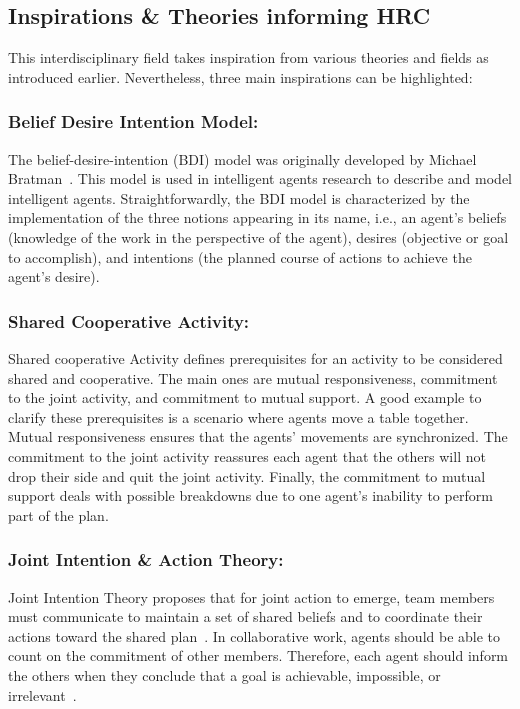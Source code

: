 \subsection{Inspirations \& Theories informing HRC}

This interdisciplinary field takes inspiration from various theories and fields as introduced earlier. Nevertheless, three main inspirations can be highlighted:

\subsubsection*{Belief Desire Intention Model:} The belief-desire-intention (BDI) model was originally developed by Michael Bratman~\cite{Bratman1987_BRAIPA}. This model is used in intelligent agents research to describe and model intelligent agents. Straightforwardly, the BDI model is characterized by the implementation of the three notions appearing in its name, i.e., an agent's beliefs (knowledge of the work in the perspective of the agent), desires (objective or goal to accomplish), and intentions (the planned course of actions to achieve the agent's desire). 

\subsubsection*{Shared Cooperative Activity:} Shared cooperative Activity defines prerequisites for an activity to be considered shared and cooperative. The main ones are mutual responsiveness, commitment to the joint activity, and commitment to mutual support. A good example to clarify these prerequisites is a scenario where agents move a table together. Mutual responsiveness ensures that the agents' movements are synchronized. The commitment to the joint activity reassures each agent that the others will not drop their side and quit the joint activity. Finally, the commitment to mutual support deals with possible breakdowns due to one agent's inability to perform part of the plan.  

\subsubsection*{Joint Intention \& Action Theory:} 
Joint Intention Theory proposes that for joint action to emerge, team members must communicate to maintain a set of shared beliefs and to coordinate their actions toward the shared plan~\cite{cohen_teamwork_1991}. In collaborative work, agents should be able to count on the commitment of other members. Therefore, each agent should inform the others when they conclude that a goal is achievable, impossible, or irrelevant~\cite{hoffman2004collaboration}.


